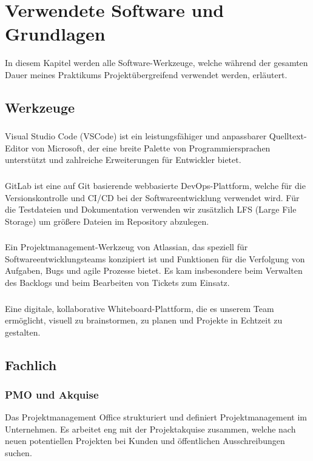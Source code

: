 \section{Verwendete Software und Grundlagen}
In diesem Kapitel werden alle Software-Werkzeuge, welche während der gesamten Dauer meines Praktikums Projektübergreifend
verwendet werden, erläutert.


\subsection{Werkzeuge}

\subsubsection{\textcite{visual-studio-code}}
Visual Studio Code (VSCode) ist ein leistungsfähiger und anpassbarer Quelltext-Editor von Microsoft, der eine breite
Palette von Programmiersprachen unterstützt und zahlreiche Erweiterungen für Entwickler bietet. 

\subsubsection{\textcite{gitlab}}
GitLab ist eine auf Git basierende webbasierte DevOps-Plattform, welche für die Versionskontrolle und CI/CD bei der
Softwareentwicklung verwendet wird. Für die Testdateien und Dokumentation verwenden wir zusätzlich LFS (Large File
Storage) um größere Dateien im Repository abzulegen.


\subsubsection{\textcite{jira}}
Ein Projektmanagement-Werkzeug von Atlassian, das speziell für Softwareentwicklungsteams konzipiert ist und Funktionen
für die Verfolgung von Aufgaben, Bugs und agile Prozesse bietet. Es kam insbesondere beim Verwalten des Backlogs und
beim Bearbeiten von Tickets zum Einsatz.

\subsubsection{\textcite{miro}}
Eine digitale, kollaborative Whiteboard-Plattform, die es unserem Team ermöglicht, visuell zu brainstormen, zu planen
und Projekte in Echtzeit zu gestalten.

\subsection{Fachlich}

\subsubsection{PMO und Akquise}
Das Projektmanagement Office strukturiert und definiert Projektmanagement im Unternehmen. Es arbeitet eng mit der
Projektakquise zusammen, welche nach neuen potentiellen Projekten bei Kunden und öffentlichen Ausschreibungen suchen.
